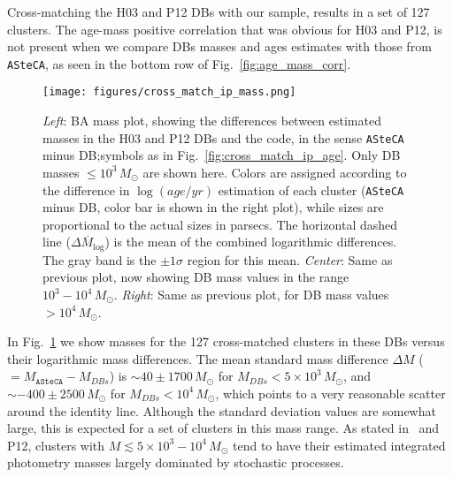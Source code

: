 \documentclass[draft]{aa}
\renewcommand{\includegraphics}[2][]{}
\begin{document}
Cross-matching the H03 and P12 DBs with our sample, results in a
set of 127 clusters. The age-mass positive correlation that was obvious for H03
and P12, is not present when we compare DBs masses and ages estimates with
those from \texttt{ASteCA}, as seen in the bottom row of
Fig.~\ref{fig:age_mass_corr}.
%
\begin{figure*}
\texttt{[image: figures/cross\_match\_ip\_mass.png]}
\caption{\emph{Left}: BA mass plot, showing the differences between estimated
masses in the H03 and P12 DBs and the code, in the sense \texttt{ASteCA} minus
DB;\@ symbols as in Fig.~\ref{fig:cross_match_ip_age}.
Only DB masses ${\le}10^3\,M_{\odot}$ are shown here.
Colors are assigned according to the difference in $\log(age/yr)$ estimation of
each cluster (\texttt{ASteCA} minus DB, color bar is shown in the right plot),
while sizes are proportional to the actual sizes in parsecs.
The horizontal dashed line ($\overline{\Delta M_{\log}}$) is the mean of the
combined logarithmic differences. The gray band is the ${\pm}1\sigma$ region for
this mean.
\emph{Center}: Same as previous plot, now showing DB mass values in the range
$10^3-10^4\,M_{\odot}$.
\emph{Right}: Same as previous plot, for DB mass values ${>}10^4\,M_{\odot}$.
}
\label{fig:cross_match_ip_mass}
\end{figure*}
%
In Fig.~\ref{fig:cross_match_ip_mass} we show masses for the 127 cross-matched
clusters in these DBs versus their logarithmic mass differences.
%
The mean standard mass difference $\Delta M$ (${=}M_{\mathtt{ASteCA}}-M_{DBs}$)
is ${\sim}40{\pm}1700\,M_{\odot}$ for $M_{DBs} {<}5{\times}10^3\,M_{\odot}$,
and ${\sim-}400{\pm}2500\,M_{\odot}$ for $M_{DBs} {<}10^4\,M_{\odot}$, which  points
to a very reasonable scatter around the identity line.
%
Although the standard deviation values are somewhat large, this is expected for
a set of clusters in this mass range. As stated in~\cite{Baumgardt_2013} and
P12, clusters with $M{\lesssim}5{\times}10^3 - 10^4\,M_{\odot}$ tend to have
their estimated integrated photometry masses largely dominated by
stochastic processes.
\end{document}
